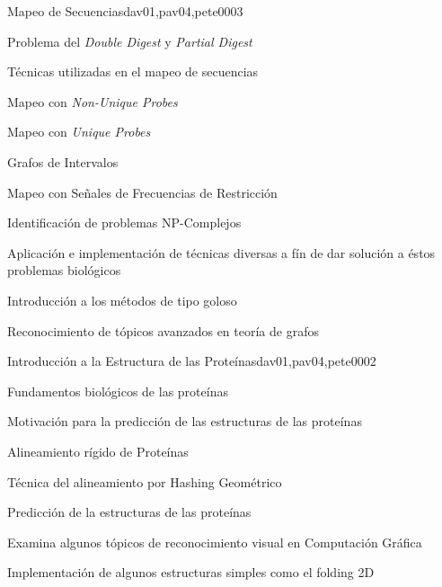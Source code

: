 \begin{syllabus}
\begin{unit}{Mapeo de Secuencias}{dav01,pav04,pete00}{0}{3}
\begin{topics}
        \item Problema del \textit{Double Digest} y \textit{Partial Digest}
        \item Técnicas utilizadas en el mapeo de secuencias
        \item Mapeo con \textit{Non-Unique Probes}
        \item Mapeo con \textit{Unique Probes}
        \item Grafos de Intervalos
        \item Mapeo con Señales de Frecuencias de Restricción
    \end{topics}
    \begin{unitgoals}
        \item Identificación de problemas NP-Complejos
        \item Aplicación e implementación de técnicas diversas a fín de dar solución a éstos problemas biológicos
        \item Introducción a los métodos de tipo goloso
        \item Reconocimiento de tópicos avanzados en teoría de grafos
    \end{unitgoals}
\end{unit}

\begin{unit}{Introducción a la Estructura de las Proteínas}{dav01,pav04,pete00}{0}{2}
\begin{topics}
        \item Fundamentos biológicos de las proteínas
        \item Motivación para la predicción de las estructuras de las proteínas
        \item Alineamiento rígido de Proteínas
        \item Técnica del alineamiento por Hashing Geométrico
        \item Predicción de la estructuras de las proteínas
    \end{topics}

    \begin{unitgoals}
        \item Examina algunos tópicos de reconocimiento visual en Computación Gráfica
        \item Implementación de algunos estructuras simples como el folding 2D
    \end{unitgoals}
\end{unit}



\begin{coursebibliography}
\end{coursebibliography}

\end{syllabus}
